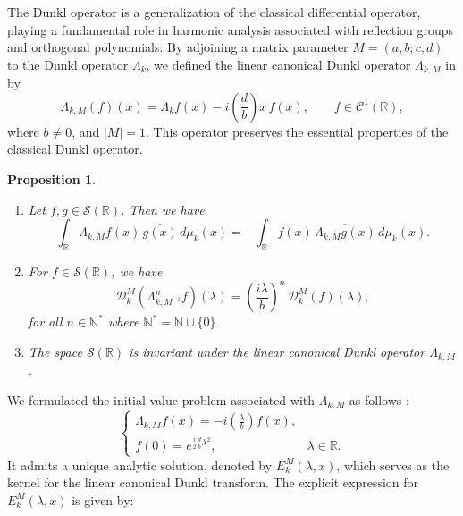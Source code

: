 \documentclass[12pt,a4paper,reqno]{amsproc}
\newtheorem{proposition}[theorem]{Proposition}
\theoremstyle{definition}
\theoremstyle{remark}
\numberwithin{equation}{section}
\begin{document}
The Dunkl operator \cite{soltani2004lp}  is a generalization of the classical differential operator, playing a fundamental role in harmonic analysis associated with reflection groups and orthogonal polynomials. By adjoining a matrix parameter $M=(a,b;c,d)$ to the Dunkl operator $\Lambda_{k}$, we defined the linear canonical Dunkl operator $\Lambda_{k,M}$ in \cite{USK} by 
\begin{equation*}
    \Lambda_{k, M}(f)(x) = \Lambda_kf(x)-i\left(\frac{d}{b}\right) x\, f(x), \qquad f \in \mathcal{C}^1(\mathbb{R}),
\end{equation*}
where  $b\neq 0$, and  $|M|=1$.  This operator preserves the essential properties of the classical Dunkl operator. 
\begin{proposition} \label{C7-P:2.1}\cite{USK2}
\begin{enumerate}[$(i)$]
\item Let $f,g \in \mathcal{S(\mathbb{R})}$. Then we have 
\begin{equation*}
    \int_{\mathbb{R}} \Lambda_{k,M} f(x)\, \overline{ g(x)}\,  d\mu_k(x) = -\int_{\mathbb{R}} f(x)\,\overline{\Lambda_{k,M}
    g(x)}\,  d\mu_k(x).
\end{equation*}
\vspace{.2cm}
\item For $f\in \mathcal{ S(\mathbb{R})} $, we have 
\begin{equation}\label{C7-e:2.1}
\mathcal{D}_k^M \left( \Lambda_{k, M^{-1}}^nf\right)(\lambda) = \left( \frac{i\lambda}{b}\right)^n \, \mathcal{D}_k^M(f)(\lambda),
\end{equation}
for all $n \in \mathbb{N}^*$ where $\mathbb{N}^* = \mathbb{N}\cup \{0\}$.
\vspace{.2cm}
\item The space $\mathcal{S}(\mathbb{R})$ is invariant under the linear canonical Dunkl operator $\Lambda_{k,M}$.
\end{enumerate}
\end{proposition}
We formulated the initial value problem associated with $\Lambda_{k,M}$ as follows \cite{USK}: 
\begin{equation*}
 \left \{
 \begin{array}{ll}
 \Lambda_{k, M} f(x) =-i\left(\frac{\lambda}{b}\right) f(x),     & \mbox{}  \\
 f(0) = e^{\frac{i}{2} \frac{d}{b} \lambda^2}, &    \lambda \in \mathbb{R}.
 \end{array}
 \right.
\end{equation*}
It admits a unique analytic solution, denoted by $E_k^M(\lambda, x)$, which serves as the kernel for the linear canonical Dunkl transform. The explicit expression for $E_k^M(\lambda,x)$ is given by:
\end{document}
